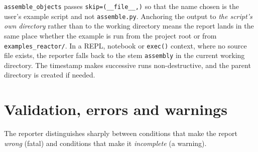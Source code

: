 \documentclass[9pt,a4paper]{extarticle}
\newcommand{\code}[1]{\texttt{\small #1}}
\newcommand{\file}[1]{\texttt{\small #1}}
\begin{document}
\code{assemble\_objects} passes \code{skip=(\_\_file\_\_,)} so that the name
chosen is the user's example script and not \file{assemble.py}. Anchoring the
output to \emph{the script's own directory} rather than to the working directory
means the report lands in the same place whether the example is run from the
project root or from \file{examples\_reactor/}. In a REPL, notebook or
\code{exec()} context, where no source file exists, the reporter falls back to
the stem \file{assembly} in the current working directory. The timestamp makes
successive runs non-destructive, and the parent directory is created if needed.

\section{Validation, errors and warnings}

The reporter distinguishes sharply between conditions that make the report
\emph{wrong} (fatal) and conditions that make it \emph{incomplete} (a warning).
\end{document}
